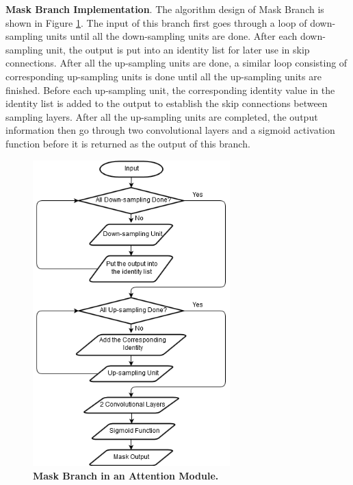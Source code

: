 \documentclass{article}
\newcommand{\mycaption}[2]{\caption[#1]{\textbf{#1.} #2}}
\begin{document}
\begin{multicols}{2}
\textbf{Mask Branch Implementation}. The algorithm design of Mask Branch is shown in Figure \ref{fig:mask_flowchart}. The input of this branch first goes through a loop of down-sampling units until all the down-sampling units are done. After each down-sampling unit, the output is put into an identity list for later use in skip connections. After all the up-sampling units are done, a similar loop consisting of corresponding up-sampling units is done until all the up-sampling units are finished. Before each up-sampling unit, the corresponding identity value in the identity list is added to the output to establish the skip connections between sampling layers. After all the up-sampling units are completed, the output information then go through two convolutional layers and a sigmoid activation function before it is returned as the output of this branch.
\begin{figure}[H] 
\includegraphics[width=3in]{imgs/mask_flowchart.png}  
\mycaption{Mask Branch in an Attention Module}{}  
\label{fig:mask_flowchart}
\end{figure}


\end{multicols}
\end{document}
